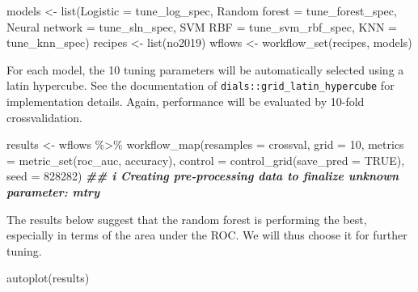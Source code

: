 \documentclass[
]{article}
\newenvironment{Shaded}{\begin{snugshade}}{\end{snugshade}}
\newcommand{\AttributeTok}[1]{\textcolor[rgb]{0.77,0.63,0.00}{#1}}
\newcommand{\ConstantTok}[1]{\textcolor[rgb]{0.00,0.00,0.00}{#1}}
\newcommand{\DecValTok}[1]{\textcolor[rgb]{0.00,0.00,0.81}{#1}}
\newcommand{\DocumentationTok}[1]{\textcolor[rgb]{0.56,0.35,0.01}{\textbf{\textit{#1}}}}
\newcommand{\FunctionTok}[1]{\textcolor[rgb]{0.00,0.00,0.00}{#1}}
\newcommand{\NormalTok}[1]{#1}
\newcommand{\OtherTok}[1]{\textcolor[rgb]{0.56,0.35,0.01}{#1}}
\newcommand{\SpecialCharTok}[1]{\textcolor[rgb]{0.00,0.00,0.00}{#1}}
\newcommand{\StringTok}[1]{\textcolor[rgb]{0.31,0.60,0.02}{#1}}
\begin{document}
\begin{Shaded}
\begin{Highlighting}[]
\NormalTok{models }\OtherTok{\textless{}{-}} \FunctionTok{list}\NormalTok{(}\StringTok{\textasciigrave{}}\AttributeTok{Logistic}\StringTok{\textasciigrave{}} \OtherTok{=}\NormalTok{ tune\_log\_spec,}
               \StringTok{\textasciigrave{}}\AttributeTok{Random forest}\StringTok{\textasciigrave{}} \OtherTok{=}\NormalTok{ tune\_forest\_spec,}
               \StringTok{\textasciigrave{}}\AttributeTok{Neural network}\StringTok{\textasciigrave{}} \OtherTok{=}\NormalTok{ tune\_sln\_spec,}
               \StringTok{\textasciigrave{}}\AttributeTok{SVM RBF}\StringTok{\textasciigrave{}} \OtherTok{=}\NormalTok{ tune\_svm\_rbf\_spec,}
               \StringTok{\textasciigrave{}}\AttributeTok{KNN}\StringTok{\textasciigrave{}} \OtherTok{=}\NormalTok{ tune\_knn\_spec)}
\NormalTok{recipes }\OtherTok{\textless{}{-}} \FunctionTok{list}\NormalTok{(no2019)}
\NormalTok{wflows }\OtherTok{\textless{}{-}} \FunctionTok{workflow\_set}\NormalTok{(recipes, models)}
\end{Highlighting}
\end{Shaded}

For each model, the 10 tuning parameters will be automatically selected
using a latin hypercube. See the documentation of
\texttt{dials::grid\_latin\_hypercube} for implementation details.
Again, performance will be evaluated by 10-fold crossvalidation.

\begin{Shaded}
\begin{Highlighting}[]
\NormalTok{results }\OtherTok{\textless{}{-}}
\NormalTok{  wflows }\SpecialCharTok{\%\textgreater{}\%}
  \FunctionTok{workflow\_map}\NormalTok{(}\AttributeTok{resamples =}\NormalTok{ crossval,}
               \AttributeTok{grid =} \DecValTok{10}\NormalTok{,}
               \AttributeTok{metrics =} \FunctionTok{metric\_set}\NormalTok{(roc\_auc, accuracy),}
               \AttributeTok{control =} \FunctionTok{control\_grid}\NormalTok{(}\AttributeTok{save\_pred =} \ConstantTok{TRUE}\NormalTok{),}
               \AttributeTok{seed =} \DecValTok{828282}\NormalTok{)}
\DocumentationTok{\#\# i Creating pre{-}processing data to finalize unknown parameter: mtry}
\end{Highlighting}
\end{Shaded}

The results below suggest that the random forest is performing the best,
especially in terms of the area under the ROC. We will thus choose it
for further tuning.

\begin{Shaded}
\begin{Highlighting}[]
\FunctionTok{autoplot}\NormalTok{(results)}
\end{Highlighting}
\end{Shaded}
\end{document}
